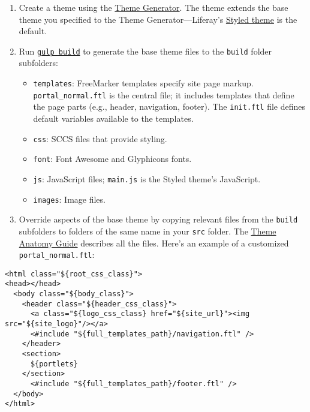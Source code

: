 \begin{enumerate}
\def\labelenumi{\arabic{enumi}.}
\item
  Create a theme using the
  \href{/docs/7-2/reference/-/knowledge_base/r/theme-generator}{Theme
  Generator}. The theme extends the base theme you specified to the
  Theme Generator---Liferay's
  \href{https://github.com/liferay/liferay-portal/tree/7.2.x/modules/apps/frontend-theme/frontend-theme-styled}{Styled
  theme} is the default.
\item
  Run
  \href{https://portal.liferay.dev/docs/7-2/frameworks/-/knowledge_base/f/building-your-themes-files}{\texttt{gulp\ build}}
  to generate the base theme files to the \texttt{build} folder
  subfolders:

  \begin{itemize}
  \item
    \texttt{templates}: FreeMarker templates specify site page markup.
    \texttt{portal\_normal.ftl} is the central file; it includes
    templates that define the page parts (e.g., header, navigation,
    footer). The \texttt{init.ftl} file defines default variables
    available to the templates.
  \item
    \texttt{css}: SCCS files that provide styling.
  \item
    \texttt{font}: Font Awesome and Glyphicons fonts.
  \item
    \texttt{js}: JavaScript files; \texttt{main.js} is the Styled
    theme's JavaScript.
  \item
    \texttt{images}: Image files.
  \end{itemize}
\item
  Override aspects of the base theme by copying relevant files from the
  \texttt{build} subfolders to folders of the same name in your
  \texttt{src} folder. The
  \href{/docs/7-2/reference/-/knowledge_base/r/theme-reference-guide}{Theme
  Anatomy Guide} describes all the files. Here's an example of a
  customized \texttt{portal\_normal.ftl}:
\end{enumerate}

\begin{verbatim}
<html class="${root_css_class}">
<head></head>
  <body class="${body_class}">
    <header class="${header_css_class}">
      <a class="${logo_css_class} href="${site_url}"><img src="${site_logo}"/></a>
      <#include "${full_templates_path}/navigation.ftl" />
    </header>
    <section>
      ${portlets}
    </section>
      <#include "${full_templates_path}/footer.ftl" />
  </body>
</html>
\end{verbatim}

